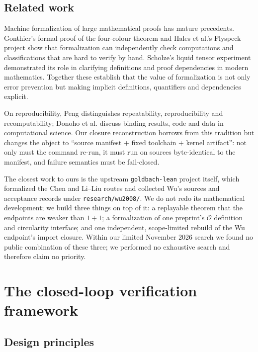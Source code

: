 \documentclass[11pt,a4paper]{article}
\theoremstyle{plain}
\theoremstyle{definition}
\begin{document}
\subsection{Related work}
\label{sec:related}

Machine formalization of large mathematical proofs has mature precedents. Gonthier's formal proof of the four-colour theorem\cite{gonthier2008} and Hales et al.'s Flyspeck project\cite{hales2017} show that formalization can independently check computations and classifications that are hard to verify by hand. Scholze's liquid tensor experiment demonstrated its role in clarifying definitions and proof dependencies in modern mathematics\cite{scholze2022}. Together these establish that the value of formalization is not only error prevention but making implicit definitions, quantifiers and dependencies explicit.

On reproducibility, Peng distinguishes repeatability, reproducibility and recomputability\cite{peng2011}; Donoho et al. discuss binding results, code and data in computational science\cite{donoho2009}. Our closure reconstruction borrows from this tradition but changes the object to ``source manifest + fixed toolchain + kernel artifact'': not only must the command re-run, it must run on sources byte-identical to the manifest, and failure semantics must be fail-closed.

The closest work to ours is the upstream \texttt{goldbach-lean} project itself\cite{upstream}, which formalized the Chen and Li--Liu routes and collected Wu's sources and acceptance records under \texttt{research/wu2008/}. We do not redo its mathematical development; we build three things on top of it: a replayable theorem that the endpoints are weaker than $1+1$; a formalization of one preprint's $\mathcal O$ definition and circularity interface; and one independent, scope-limited rebuild of the Wu endpoint's import closure. Within our limited November 2026 search we found no public combination of these three; we performed no exhaustive search and therefore claim no priority.

\section{The closed-loop verification framework}
\label{sec:framework}

\subsection{Design principles}
\label{sec:principles}
\end{document}
